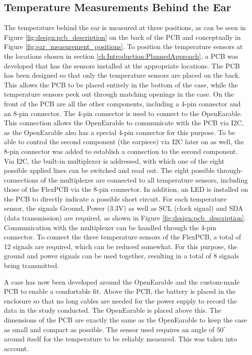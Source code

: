 \subsection{Temperature Measurements Behind the Ear}
\label{ch:Design:Prototype:BehindEar}

The temperature behind the ear is measured at three positions, as can be seen in Figure \ref{fig:design:pcb_description} on the back of the PCB and conceptually in Figure \ref{fig:ear_measurement_positions}.
To position the temperature sensors at the locations chosen in section \ref{ch:Introduction:PlannedApproach}, a PCB was developed that has the sensors installed at the appropriate locations. 
The PCB has been designed so that only the temperature sensors are placed on the back. This allows the PCB to be placed entirely in the bottom of the case, while the temperature sensors peek out through matching openings in the case. On the front of the PCB are all the other components, including a 4-pin connector and an 8-pin connector.
The 4-pin connector is used to connect to the OpenEarable. This connection allows the OpenEarable to communicate with the PCB via I2C, as the OpenEarable also has a special 4-pin connector for this purpose.
To be able to control the second component (the earpiece) via I2C later on as well, the 8-pin connector was added to establish a connection to the second component.
Via I2C, the built-in multiplexer is addressed, with which one of the eight possible applied lines can be switched and read out. The eight possible through-connections of the multiplexer are connected to all temperature sensors, including those of the FlexPCB via the 8-pin connector.
In addition, an LED is installed on the PCB to directly indicate a possible short circuit.
For each temperature sensor, the signals Ground, Power (3.3V) as well as SCL (clock signal) and SDA (data transmission) are required, as shown in Figure \ref{fig:design:pcb_description}. Communication with the multiplexer can be handled through the 4-pin connector.
To connect the three temperature sensors of the FlexPCB, a total of 12 signals are required, which can be reduced somewhat. For this purpose, the ground and power signals can be used together, resulting in a total of 8 signals being transmitted.

A case has now been developed around the OpenEarable and the custom-made PCB to enable a comfortable fit.
Above the PCB, the battery is placed in the enclosure so that no long cables are needed for the power supply to record the data in the study conducted.
The OpenEarable is placed above this.
The dimensions of the PCB are exactly the same as the OpenEarable to keep the case as small and compact as possible.
The sensor used requires an angle of $ 50 ^ \circ$ around itself for the temperature to be reliably measured. 
This was taken into account.

